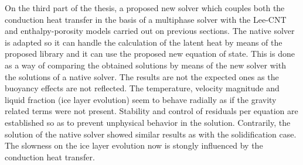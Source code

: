 \noindent On the third part of the thesis, a proposed new solver which couples both the conduction heat transfer in the basis of a multiphase solver with the Lee-CNT and enthalpy-porosity models carried out on previous sections. The native solver is adapted so it can handle the calculation of the latent heat by means of the proposed library and it can use the proposed new equation of state. This is done as a way of comparing the obtained solutions by means of the new solver with the solutions of a native solver. The results are not the expected ones as the buoyancy effects are not reflected. The temperature, velocity magnitude and liquid fraction (ice layer evolution) seem to behave radially as if the gravity related terms were not present. Stability and control of residuals per equation are established so as to prevent unphysical behavior in the solution. Contrarily, the solution of the native solver showed similar results as with the solidification case. The slowness on the ice layer evolution now is stongly influenced by the conduction heat transfer. 

